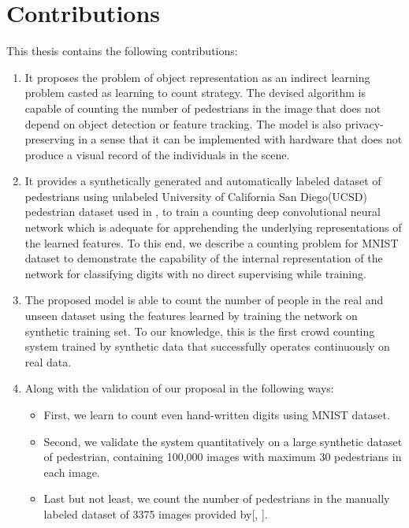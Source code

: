 \section{Contributions}
This thesis contains the following contributions:
\begin{enumerate}
	\item It proposes the problem of object representation as an indirect learning problem casted as learning to count strategy. The devised algorithm is capable of counting the number of pedestrians in the image that does not depend on object detection or feature tracking. The model is also privacy-preserving in a sense that it can be implemented with hardware that does not produce a visual record of the individuals in the scene. 
	\item It provides a synthetically generated and automatically labeled dataset of pedestrians using unlabeled University of California San Diego(UCSD) pedestrian dataset used in \cite{mahadevan2010anomaly}, to train a counting deep convolutional neural network which is adequate for apprehending the underlying representations of the learned features. To this end, we describe a counting problem for MNIST dataset to demonstrate the capability of the internal representation of the network for classifying digits with no direct supervising while training. 
	\item The proposed model is able to count the number of people in the real and unseen dataset using the features learned by training the network on synthetic training set. To our knowledge, this is the first crowd counting system trained by synthetic data that successfully operates continuously on real data. 
	\item Along with the validation of our proposal in the following ways:
	\begin{itemize}
		\item First, we learn to count even hand-written digits using MNIST dataset. 
		\item Second, we validate the system quantitatively on a large synthetic dataset of pedestrian, containing 100,000 images with maximum 30 pedestrians in each image. 
		\item Last but not least, we count the number of pedestrians in the manually labeled dataset of 3375 images provided by[\citeauthor*{chan2013ground}, \citeyear{chan2013ground}]. 
	\end{itemize}
	
\end{enumerate}

